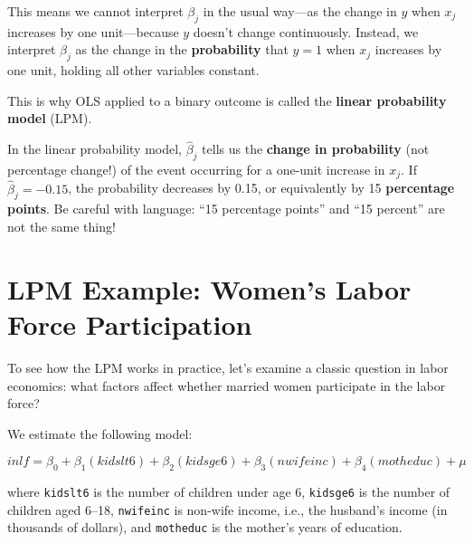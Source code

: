 \documentclass[
  letterpaper,
  DIV=11,
  numbers=noendperiod]{scrreprt}
\begin{document}
This means we cannot interpret \(\beta_j\) in the usual way---as the
change in \(y\) when \(x_j\) increases by one unit---because \(y\)
doesn't change continuously. Instead, we interpret \(\beta_j\) as the
change in the \textbf{probability} that \(y = 1\) when \(x_j\) increases
by one unit, holding all other variables constant.

This is why OLS applied to a binary outcome is called the \textbf{linear
probability model} (LPM).

\begin{tcolorbox}[enhanced jigsaw, arc=.35mm, bottomrule=.15mm, bottomtitle=1mm, breakable, colback=white, colbacktitle=quarto-callout-note-color!10!white, colframe=quarto-callout-note-color-frame, coltitle=black, left=2mm, leftrule=.75mm, opacityback=0, opacitybacktitle=0.6, rightrule=.15mm, title=\textcolor{quarto-callout-note-color}{\faInfo}\hspace{0.5em}{The LPM Interpretation Rule}, titlerule=0mm, toprule=.15mm, toptitle=1mm]

In the linear probability model, \(\hat{\beta}_j\) tells us the
\textbf{change in probability} (not percentage change!) of the event
occurring for a one-unit increase in \(x_j\). If
\(\hat{\beta}_j = -0.15\), the probability decreases by 0.15, or
equivalently by 15 \textbf{percentage points}. Be careful with language:
``15 percentage points'' and ``15 percent'' are not the same thing!

\end{tcolorbox}

\section{LPM Example: Women's Labor Force
Participation}\label{lpm-example-womens-labor-force-participation}

To see how the LPM works in practice, let's examine a classic question
in labor economics: what factors affect whether married women
participate in the labor force?

We estimate the following model:

\[
inlf = \beta_0 + \beta_1(kidslt6) + \beta_2(kidsge6) + \beta_3(nwifeinc) + \beta_4(motheduc) + \mu
\]

where \texttt{kidslt6} is the number of children under age 6,
\texttt{kidsge6} is the number of children aged 6--18, \texttt{nwifeinc}
is non-wife income, i.e., the husband's income (in thousands of
dollars), and \texttt{motheduc} is the mother's years of education.
\end{document}
